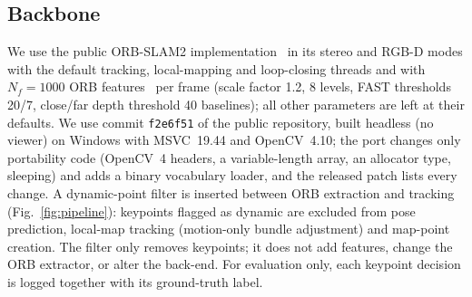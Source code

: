 \documentclass[conference]{IEEEtran}
\begin{document}
\subsection{Backbone}
\label{sec:backbone}
We use the public ORB-SLAM2 implementation~\cite{murartal2017orbslam2} in its stereo and RGB-D modes with the default tracking, local-mapping and loop-closing threads and with $N_f=1000$ ORB features~\cite{rublee2011orb} per frame (scale factor 1.2, 8 levels, FAST thresholds 20/7, close/far depth threshold 40 baselines); all other parameters are left at their defaults. We use commit \texttt{f2e6f51} of the public repository, built headless (no viewer) on Windows with MSVC~19.44 and OpenCV~4.10; the port changes only portability code (OpenCV~4 headers, a variable-length array, an allocator type, sleeping) and adds a binary vocabulary loader, and the released patch lists every change. A dynamic-point filter is inserted between ORB extraction and tracking (Fig.~\ref{fig:pipeline}): keypoints flagged as dynamic are excluded from pose prediction, local-map tracking (motion-only bundle adjustment) and map-point creation. The filter only removes keypoints; it does not add features, change the ORB extractor, or alter the back-end. For evaluation only, each keypoint decision is logged together with its ground-truth label.
\end{document}
